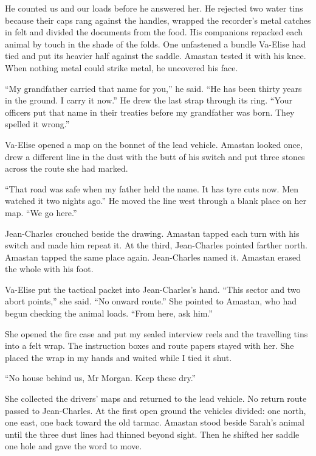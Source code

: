 He counted us and our loads before he answered her. He rejected two water tins because their caps rang against the handles, wrapped the recorder's metal catches in felt and divided the documents from the food. His companions repacked each animal by touch in the shade of the folds. One unfastened a bundle Va-Elise had tied and put its heavier half against the saddle. Amastan tested it with his knee. When nothing metal could strike metal, he uncovered his face.\par

``My grandfather carried that name for you,'' he said. ``He has been thirty years in the ground. I carry it now.'' He drew the last strap through its ring. ``Your officers put that name in their treaties before my grandfather was born. They spelled it wrong.''\par

Va-Elise opened a map on the bonnet of the lead vehicle. Amastan looked once, drew a different line in the dust with the butt of his switch and put three stones across the route she had marked.\par

``That road was safe when my father held the name. It has tyre cuts now. Men watched it two nights ago.'' He moved the line west through a blank place on her map. ``We go here.''\par

Jean-Charles crouched beside the drawing. Amastan tapped each turn with his switch and made him repeat it. At the third, Jean-Charles pointed farther north. Amastan tapped the same place again. Jean-Charles named it. Amastan erased the whole with his foot.\par

Va-Elise put the tactical packet into Jean-Charles's hand. ``This sector and two abort points,'' she said. ``No onward route.'' She pointed to Amastan, who had begun checking the animal loads. ``From here, ask him.''\par

She opened the fire case and put my sealed interview reels and the travelling tins into a felt wrap. The instruction boxes and route papers stayed with her. She placed the wrap in my hands and waited while I tied it shut.\par

``No house behind us, Mr Morgan. Keep these dry.''\par

She collected the drivers' maps and returned to the lead vehicle. No return route passed to Jean-Charles. At the first open ground the vehicles divided: one north, one east, one back toward the old tarmac. Amastan stood beside Sarah's animal until the three dust lines had thinned beyond sight. Then he shifted her saddle one hole and gave the word to move.\par


